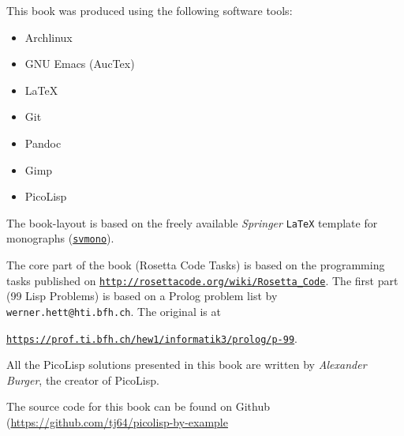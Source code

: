 %
%


This book was produced using the following software tools:

\begin{itemize}
\item Archlinux
\item GNU Emacs (AucTex)
\item LaTeX
\item Git
\item Pandoc
\item Gimp
\item PicoLisp
\end{itemize}

The book-layout is based on the freely available \emph{Springer}
\texttt{LaTeX} template for monographs
(\href{http://www.springer.com/authors/book+authors?SGWID=0-154102-12-970131-0}{\texttt{svmono}}).

The core part of the book (Rosetta Code Tasks) is based on the
programming tasks published on
\href{http://rosettacode.org/wiki/Rosetta_Code}{\texttt{http://rosettacode.org/wiki/Rosetta\_Code}}.
The first part (99 Lisp Problems) is based on a Prolog problem list by
\texttt{werner.hett@hti.bfh.ch}. The original is at

\href{https://prof.ti.bfh.ch/hew1/informatik3/prolog/p-99}{\texttt{https://prof.ti.bfh.ch/hew1/informatik3/prolog/p-99}}.
     
All the PicoLisp solutions presented in this book are written by
\emph{Alexander Burger}, the creator of PicoLisp. 

The source code for this book can be found on Github (\href{https://github.com/tj64/picolisp-by-example}{\url{https://github.com/tj64/picolisp-by-example}}





